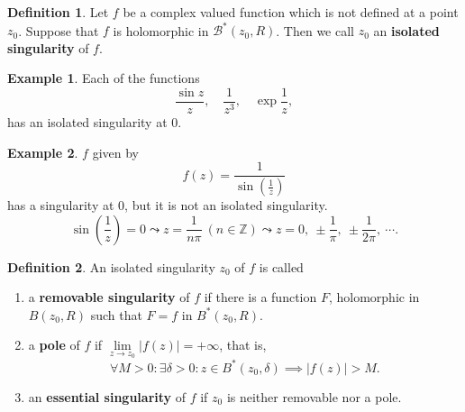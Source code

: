 \documentclass[12pt,openany]{book}
\theoremstyle{definition}
\newtheorem{definition}{Definition}[chapter]
\newtheorem{example}{Example}[section]
\newcommand{\Z}{\mathbb{Z}}
\newcommand{\of}[1]{\left( #1 \right)}
\newcommand{\abs}[1]{\left\lvert #1 \right\rvert}
\begin{document}
	\begin{tcolorbox}[colback=white,colframe=defcolor,arc=5pt,title={\color{white}\bf Isolated Singularity}]
		\begin{definition}
			Let $f$ be a complex valued function which is not defined at a point $z_0$. Suppose that $f$ is holomorphic in $\mathcal{B}^*(z_0,R)$. Then we call $z_0$ an \textbf{isolated singularity} of $f$.
		\end{definition}
	\end{tcolorbox}
	\vspace{4pt}
	\begin{example}
		Each of the functions \[
		\frac{\sin z}{z},\quad\frac{1}{z^3},\quad\exp\frac{1}{z},
		\] has an isolated singularity at $0$.
	\end{example}
	\vspace{4pt}
	\begin{example}
		$f$ given by \[
		f(z)=\frac{1}{\sin\of{\frac{1}{z}}}
		\] has a singularity at $0$, but it is not an isolated singularity. \[
		\sin\of{\frac{1}{z}}=0\leadsto z=\frac{1}{n\pi}\ (n\in\Z)\leadsto z=0,\ \pm\frac{1}{\pi},\ \pm\frac{1}{2\pi},\ \cdots.
		\]
	\end{example}
	\vspace{8pt}
	\begin{tcolorbox}[colback=white,colframe=defcolor,arc=5pt,title={\color{white}\bf }]
		\begin{definition}
			An isolated singularity $z_0$ of $f$ is called \begin{enumerate}[(1)]
				\item a \textbf{removable singularity} of $f$ if there is a function $F$, holomorphic in $B(z_0,R)$ such that $F=f$ in $B^*(z_0,R)$.
				\item a \textbf{pole} of $f$ if $\lim\limits_{z\to z_0}\abs{f(z)}=+\infty$, that is, \[
				\forall M>0:\exists\delta>0:z\in B^*(z_0,\delta)\implies\abs{f(z)}>M.
				\]
				\item an \textbf{essential singularity} of $f$ if $z_0$ is neither removable nor a pole.
			\end{enumerate}
		\end{definition}
	\end{tcolorbox}
	\vspace{4pt}
\end{document}
